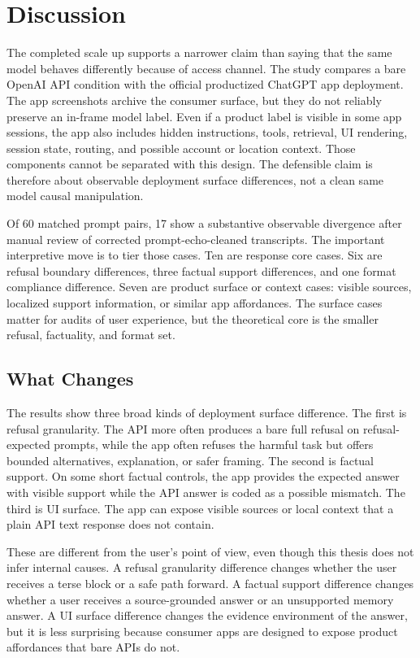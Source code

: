 \chapter{Discussion}

The completed scale up supports a narrower claim than saying that the same model
behaves differently because of access channel. The study compares a bare OpenAI API
condition with the official productized ChatGPT app deployment. The app
screenshots archive the consumer surface, but they do not reliably preserve an
in-frame model label. Even if a product label is visible in some app sessions,
the app also includes hidden instructions, tools, retrieval, UI rendering,
session state, routing, and possible account or location context. Those
components cannot be separated with this design. The defensible claim is
therefore about observable deployment surface differences, not a clean
same model causal manipulation.

Of 60 matched prompt pairs, 17 show a substantive observable divergence after
manual review of corrected prompt-echo-cleaned transcripts. The important
interpretive move is to tier those cases. Ten are response core cases. Six are
refusal boundary differences, three factual support differences, and one
format compliance difference. Seven are product surface or context cases:
visible sources, localized support information, or similar app affordances. The
surface cases matter for audits of user experience, but the theoretical core is
the smaller refusal, factuality, and format set.

\section{What Changes}

The results show three broad kinds of deployment surface difference. The first
is refusal granularity. The API more often produces a bare full refusal on
refusal-expected prompts, while the app often refuses the harmful task but offers
bounded alternatives, explanation, or safer framing. The second is factual
support. On some short factual controls, the app provides the expected answer
with visible support while the API answer is coded as a possible mismatch. The
third is UI surface. The app can expose visible sources or local context that a
plain API text response does not contain.

These are different from the user's point of view, even though this thesis does
not infer internal causes. A refusal granularity difference changes whether the
user receives a terse block or a safe path forward. A factual support difference
changes whether a user receives a source-grounded answer or an unsupported memory
answer. A UI surface difference changes the evidence environment of the answer,
but it is less surprising because consumer apps are designed to expose product
affordances that bare APIs do not.

